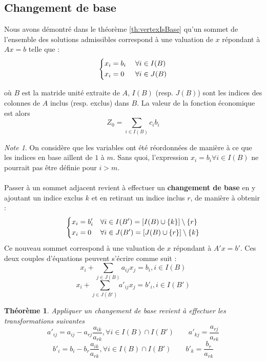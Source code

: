 \documentclass[a4paper]{report}
\theoremstyle{definition}
\theoremstyle{remark}
\newtheorem*{note}{Note}
\theoremstyle{plain}
\newtheorem{theorem}{Théorème}
\begin{document}
\subsection{Changement de base}
Nous avons démontré dans le théorème \ref{th:vertexIsBase} qu'un sommet de
l'ensemble des solutions admissibles correspond à une valuation de $x$ répondant
à $Ax = b$ telle que :
\[\begin{dcases}
	x_i = b_i\;&\forall i \in I(B) \\
	x_i = 0&\forall i \in J(B)
\end{dcases}\]

où $B$ est la matride unité extraite de \(A\), $I(B)$ (resp. $J(B)$) sont les
indices des colonnes de $A$ inclus (resp. exclus) dans $B$. La valeur de la
fonction économique est alors
\[Z_0=\sum_{i\in I(B)}c_ib_i\]

\begin{note}
On considère que les variables ont été réordonnées de manière à ce que les
indices en base aillent de \(1\) à \(m\). Sans quoi, l'expression \(x_i =
b_i\forall i \in I(B)\) ne pourrait pas être définie pour \(i > m\).
\end{note}

\paragraph{}
Passer à un sommet adjacent revient à effectuer un \textbf{changement de base}
en y ajoutant un indice exclus $k$ et en retirant un indice inclus $r$, de
manière à obtenir :
\[\begin{dcases}
	x_i = b'_i &\forall i \in I(B') = [I(B) \cup \{k\}] \setminus \{r\} \\
	x_i = 0    &\forall i \in J(B') = [J(B) \cup \{r\}] \setminus \{k\}
\end{dcases}\]
Ce nouveau sommet correspond à une valuation de $x$ répondant à $A'x = b'$.
Ces deux couples d'équations peuvent s'écrire comme suit :
\begin{equation}
\label{eq:base-general}
x_i + \sum_{j \in J(B)}{a_{ij}x_j} = b_i , i \in I(B)
\end{equation}
\begin{equation}
\label{eq:base'-general}
x_i + \sum_{j \in J(B')}{a'_{ij}x_j} = b'_i , i \in I(B')
\end{equation}

\begin{theorem}
Appliquer un changement de base revient à effectuer les transformations suivantes
\[a'_{ij} = a_{ij} - a_{rj} \frac{a_{ik}}{a_{rk}}, \forall i \in I(B) \cap I(B') \qquad a'_{kj} = \frac{a_{rj}}{a_{rk}}\]
\[b'_i = b_i - b_r \frac{a_{ik}}{a_{rk}}, \forall i \in I(B) \cap I(B') \qquad b'_{k} = \frac{b_r}{a_{rk}}\]
\end{theorem}
\end{document}
